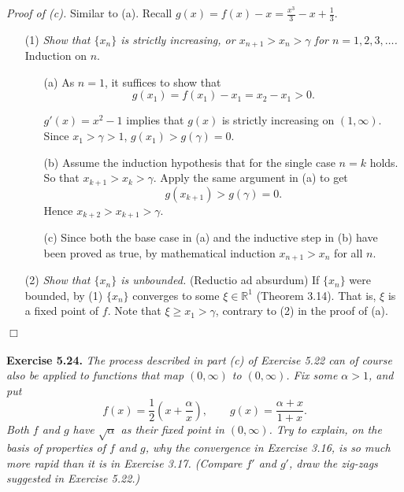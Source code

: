 \documentclass{article}
\begin{document}
\emph{Proof of (c).}
Similar to (a).
Recall $g(x) = f(x) - x = \frac{x^3}{3} - x + \frac{1}{3}$.
\begin{enumerate}
\item[(1)]
\emph{Show that $\{x_n\}$ is strictly increasing,
or $x_{n+1} > x_n > \gamma$ for $n = 1, 2, 3, \ldots$.}
Induction on $n$.
  \begin{enumerate}
  \item[(a)]
  As $n = 1$, it suffices to show that
  \[
    g(x_1) = f(x_1) - x_1 = x_2 - x_1 > 0.
  \]

  $g'(x) = x^2 - 1$ implies that $g(x)$ is strictly increasing on $(1, \infty)$.
  Since $x_1 > \gamma > 1$, $g(x_1) > g(\gamma) = 0$.

  \item[(b)]
  Assume the induction hypothesis that for the single case $n = k$ holds.
  So that $x_{k+1} > x_k > \gamma$.
  Apply the same argument in (a) to get
  \[
    g(x_{k+1}) > g(\gamma) = 0.
  \]
  Hence $x_{k+2} > x_{k+1} > \gamma$.

  \item[(c)]
  Since both the base case in (a) and
  the inductive step in (b) have been proved as true,
  by mathematical induction $x_{n+1} > x_n$ for all $n$.
  \end{enumerate}

\item[(2)]
\emph{Show that $\{x_n\}$ is unbounded.}
(Reductio ad absurdum)
If $\{x_n\}$ were bounded,
by (1) $\{x_n\}$ converges to some $\xi \in \mathbb{R}^1$ (Theorem 3.14).
That is, $\xi$ is a fixed point of $f$.
Note that $\xi \geq x_1 > \gamma$, contrary to (2) in the proof of (a).
\end{enumerate}
$\Box$ \\\\






\textbf{Exercise 5.24.}
\emph{The process described in part (c) of Exercise 5.22 can of course also be applied to
functions that map $(0,\infty)$ to $(0,\infty)$.
Fix some $\alpha > 1$, and put
\[
  f(x) = \frac{1}{2} \left( x + \frac{\alpha}{x} \right), \qquad
  g(x) = \frac{\alpha + x}{1 + x}.
\]
Both $f$ and $g$ have $\sqrt{\alpha}$ as their fixed point in $(0,\infty)$.
Try to explain, on the basis of properties of $f$ and $g$,
why the convergence in Exercise 3.16, is so much more rapid than it is in Exercise 3.17.
(Compare $f'$ and $g'$, draw the zig-zags suggested in Exercise 5.22.)} \\
\end{document}
